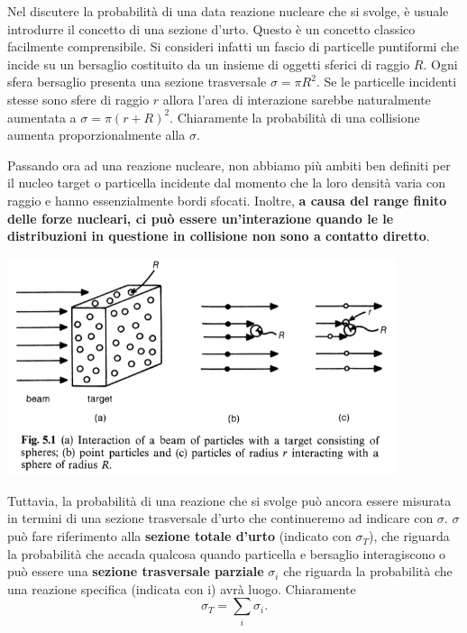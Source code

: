 \documentclass[a4paper,11pt,twoside,openany]{book}
\theoremstyle{definition}
\theoremstyle{plain}
\theoremstyle{plain}
\theoremstyle{definition}
\begin{document}
Nel discutere la probabilità di una data reazione nucleare che si svolge, è usuale introdurre il concetto di una sezione d'urto. Questo è un concetto classico facilmente comprensibile. Si consideri infatti un fascio di particelle puntiformi che incide su un bersaglio costituito da un insieme di oggetti sferici di raggio $R$. Ogni sfera bersaglio presenta una sezione trasversale $\sigma=\pi R^2$. Se le particelle incidenti stesse sono sfere di raggio $r$ allora l'area di interazione sarebbe naturalmente aumentata a $\sigma=\pi\left(r+R\right)^2$. Chiaramente la probabilità di una collisione aumenta proporzionalmente alla $\sigma$.

Passando ora ad una reazione nucleare, non abbiamo più ambiti ben definiti per il nucleo target o particella incidente dal momento che la loro densità varia con raggio e hanno essenzialmente bordi sfocati. Inoltre, \textbf{a causa del range finito delle forze nucleari, ci può essere un'interazione quando le le distribuzioni in questione in collisione non sono a contatto diretto}.

\begin{center}
\includegraphics[width=4.5in]{immagini/cross-section.jpg} %
\end{center}

Tuttavia, la probabilità di una reazione che si svolge può ancora essere misurata in termini di una sezione trasversale d'urto che continueremo ad indicare con $\sigma$. $\sigma$ può fare riferimento alla \textbf{sezione totale d'urto} (indicato con $\sigma_T$), che riguarda la probabilità che accada qualcosa quando particella e bersaglio interagiscono o può essere una \textbf{sezione trasversale parziale} $\sigma_i$ che riguarda la probabilità che una reazione specifica (indicata con i) avrà luogo. Chiaramente
\begin{equation}
\sigma_T=\sum_i{\sigma_i}.
\end{equation}
\end{document}
